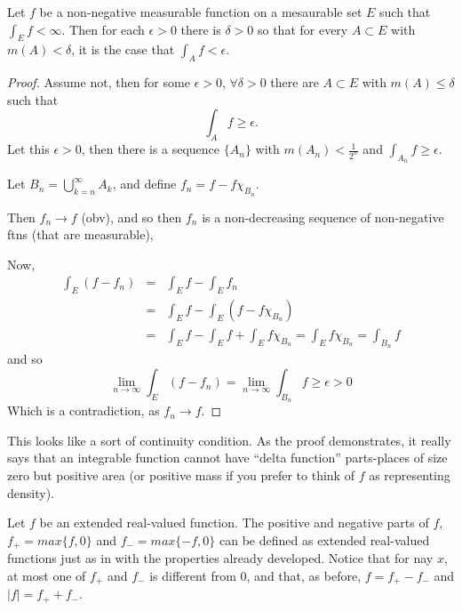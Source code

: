 \begin{pblm}%
	Let $f$ be a non-negative measurable function on a mesaurable set $E$ such that 
	$\int_E f < \infty$. Then for each $\epsilon > 0$ there is $\delta > 0$ so that 
	for every $A \subset E$ with $m(A) < \delta$, it is the case that $\int_Af<\epsilon$. 
\begin{proof}
	Assume not, then for some $\epsilon > 0$, $\forall \delta > 0$ there are 
	$A \subset E$ with $m(A) \le \delta$ such that 
	\begin{equation*}
		\int_A f \ge \epsilon.
	\end{equation*}
	Let this $\epsilon > 0$, then there is a sequence $\{A_n\}$ with 
	$m(A_n) < \frac{1}{2^n}$ and $\int_{A_n} f \ge \epsilon$. 

	Let $B_n =\bigcup\limits_{k=n}^\infty A_k$, and define $f_n = f - f\chi_{B_n}$. 

	Then $f_n \rightarrow f$ (obv), and so 
	then $f_n$ is a non-decreasing sequence of non-negative ftns (that are measurable), 

	Now, 
	\begin{equation*}
	\begin{array}{rcl}
		\int_E (f - f_n) & = & \int_E f - \int_E f_n \\
		& = & \int_E f - \int_E (f - f\chi_{B_n}) \\
		& = & \int_E f - \int_E f + \int_E f\chi_{B_n} = \int_E f\chi_{B_n} = \int_{B_n} f
	\end{array}
	\end{equation*}
	and so 
	\begin{equation*}
		\lim\limits_{n\to\infty} \int_E (f - f_n) = \lim\limits_{n\to\infty} \int_{B_n} f \ge \epsilon > 0
	\end{equation*}
	Which is a contradiction, as $f_n \rightarrow f$. 
\end{proof}
\end{pblm}

\begin{rmk}%
	This looks like a sort of continuity condition. As the proof demonstrates, it 
	really says that an integrable function cannot have ``delta function'' 
	parts-places of size zero but positive area (or positive mass if you prefer to 
	think of $f$ as representing density). 
\end{rmk}

\begin{rmk}%
	Let $f$ be an extended real-valued function. The positive and negative parts of 
	$f$, $f_+ = max\{f, 0\}$ and $f_- = max\{-f, 0\}$ can be defined as extended 
	real-valued functions just as in  with the properties already 
	developed. Notice that for nay $x$, at most one of $f_+$ and $f_-$ is different 
	from 0, and that, as before, $f = f_+ - f_-$ and $|f| = f_+ + f_-$. 
\end{rmk}

